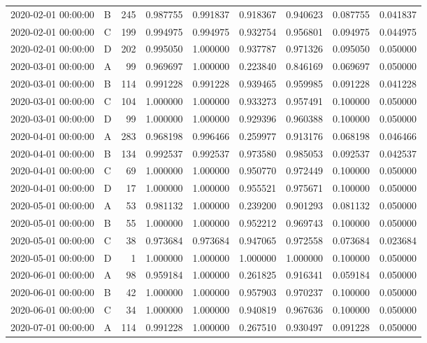 \begin{tabular}{llrrrrrrr}
2020-02-01 00:00:00 & B & 245 & 0.987755 & 0.991837 & 0.918367 & 0.940623 & 0.087755 & 0.041837 \\
2020-02-01 00:00:00 & C & 199 & 0.994975 & 0.994975 & 0.932754 & 0.956801 & 0.094975 & 0.044975 \\
2020-02-01 00:00:00 & D & 202 & 0.995050 & 1.000000 & 0.937787 & 0.971326 & 0.095050 & 0.050000 \\
2020-03-01 00:00:00 & A & 99 & 0.969697 & 1.000000 & 0.223840 & 0.846169 & 0.069697 & 0.050000 \\
2020-03-01 00:00:00 & B & 114 & 0.991228 & 0.991228 & 0.939465 & 0.959985 & 0.091228 & 0.041228 \\
2020-03-01 00:00:00 & C & 104 & 1.000000 & 1.000000 & 0.933273 & 0.957491 & 0.100000 & 0.050000 \\
2020-03-01 00:00:00 & D & 99 & 1.000000 & 1.000000 & 0.929396 & 0.960388 & 0.100000 & 0.050000 \\
2020-04-01 00:00:00 & A & 283 & 0.968198 & 0.996466 & 0.259977 & 0.913176 & 0.068198 & 0.046466 \\
2020-04-01 00:00:00 & B & 134 & 0.992537 & 0.992537 & 0.973580 & 0.985053 & 0.092537 & 0.042537 \\
2020-04-01 00:00:00 & C & 69 & 1.000000 & 1.000000 & 0.950770 & 0.972449 & 0.100000 & 0.050000 \\
2020-04-01 00:00:00 & D & 17 & 1.000000 & 1.000000 & 0.955521 & 0.975671 & 0.100000 & 0.050000 \\
2020-05-01 00:00:00 & A & 53 & 0.981132 & 1.000000 & 0.239200 & 0.901293 & 0.081132 & 0.050000 \\
2020-05-01 00:00:00 & B & 55 & 1.000000 & 1.000000 & 0.952212 & 0.969743 & 0.100000 & 0.050000 \\
2020-05-01 00:00:00 & C & 38 & 0.973684 & 0.973684 & 0.947065 & 0.972558 & 0.073684 & 0.023684 \\
2020-05-01 00:00:00 & D & 1 & 1.000000 & 1.000000 & 1.000000 & 1.000000 & 0.100000 & 0.050000 \\
2020-06-01 00:00:00 & A & 98 & 0.959184 & 1.000000 & 0.261825 & 0.916341 & 0.059184 & 0.050000 \\
2020-06-01 00:00:00 & B & 42 & 1.000000 & 1.000000 & 0.957903 & 0.970237 & 0.100000 & 0.050000 \\
2020-06-01 00:00:00 & C & 34 & 1.000000 & 1.000000 & 0.940819 & 0.967636 & 0.100000 & 0.050000 \\
2020-07-01 00:00:00 & A & 114 & 0.991228 & 1.000000 & 0.267510 & 0.930497 & 0.091228 & 0.050000 \\

\end{tabular}
